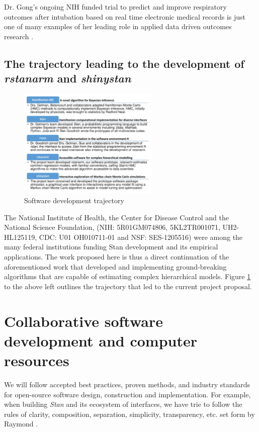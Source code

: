 \documentclass[11pt,notitlepage]{article}
\begin{document}
Dr. Gong's ongoing NIH funded trial to predict and improve 
respiratory outcomes after intubation based on real time 
electronic medical records is just one of many examples of her 
leading role in applied data driven outcomes research 
\cite{Gong2005, Gong2010, Gajic2011, Yu_24970344, Kor2014}. 

\subsection*{The trajectory leading to the development of \textit{rstanarm} and \textit{shinystan}} 

\begin{figure} 
 \vspace{- 15pt}
    \centering
\includegraphics[width=0.6\textwidth]{Figures/SoftwareTrajectory.pdf}
  \vspace{-32pt}
  \caption{Software development trajectory}
    \label{fig:trajectory}
 \vspace{- 15pt}
\end{figure}

The National Institute of Health, the Center for Disease Control and the National Science Foundation, 
(NIH: 5R01GM074806, 5KL2TR001071, UH2-HL125119,  CDC: U01 OH010711-01 and NSF: SES-1205516) were among the many 
federal institutions funding Stan \cite{Stan-manual:2015} development and its empirical applications.
The work proposed here is thus a direct continuation of the aforementioned work that developed and implementing 
ground-breaking algorithms that are capable of estimating complex hierarchical models. Figure \ref{fig:trajectory} to the above left 
outlines the trajectory that led to the current project proposal.

\section*{Collaborative software development and computer resources}
We will follow accepted best practices, proven methods, and industry standards for open-source software design, construction and implementation.
For example, when building \textit{Stan} and its ecosystem of interfaces, we have trie to follow the rules of clarity, composition, separation, 
simplicity, transparency, etc. set form by Raymond \cite{Raymond2003art}.
\end{document}
